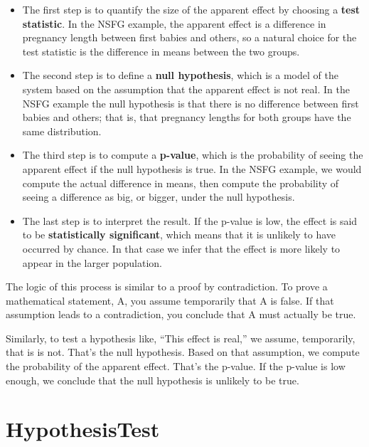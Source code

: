 \documentclass[12pt]{book}
\begin{document}
\begin{itemize}

\item The first step is to quantify the size of the apparent effect by
  choosing a {\bf test statistic}.  In the NSFG example, the apparent
  effect is a difference in pregnancy length between first babies and
  others, so a natural choice for the test statistic is the difference
  in means between the two groups.

\item The second step is to define a {\bf null hypothesis}, which is a
  model of the system based on the assumption that the apparent effect
  is not real.  In the NSFG example the null hypothesis is that there
  is no difference between first babies and others; that is, that
  pregnancy lengths for both groups have the same distribution.

\item The third step is to compute a {\bf p-value}, which is the
  probability of seeing the apparent effect if the null hypothesis is
  true.  In the NSFG example, we would compute the actual difference
  in means, then compute the probability of seeing a
  difference as big, or bigger, under the null hypothesis.

\item The last step is to interpret the result.  If the p-value is
  low, the effect is said to be {\bf statistically significant}, which
  means that it is unlikely to have occurred by chance.  In that case
  we infer that the effect is more likely to appear in the larger
  population.   

\end{itemize}

The logic of this process is similar to a proof by
contradiction.  To prove a mathematical statement, A, you assume
temporarily that A is false.  If that assumption leads to a
contradiction, you conclude that A must actually be true.

Similarly, to test a hypothesis like, ``This effect is real,'' we
assume, temporarily, that is is not.  That's the null hypothesis.
Based on that assumption, we compute the probability of the apparent
effect.  That's the p-value.  If the p-value is low enough, we
conclude that the null hypothesis is unlikely to be true.


\section{HypothesisTest}
\label{hypotest}
\end{document}
